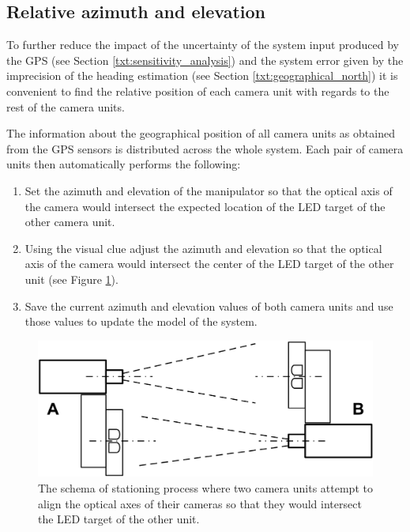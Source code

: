 \subsection{Relative azimuth and elevation}

To further reduce the impact of the uncertainty of the system input produced by the GPS (see Section \ref{txt:sensitivity_analysis}) and the system error given by the imprecision of the heading estimation (see Section \ref{txt:geographical_north}) it is convenient to find the relative position of each camera unit with regards to the rest of the camera units.

The information about the geographical position of all camera units as obtained from the GPS sensors is distributed across the whole system. Each pair of camera units then automatically performs the following:

\begin{enumerate}
	\item Set the azimuth and elevation of the manipulator so that the optical axis of the camera would intersect the expected location of the LED target of the other camera unit.
	\item Using the visual clue adjust the azimuth and elevation so that the optical axis of the camera would intersect the center of the LED target of the other unit (see Figure \ref{fig:stationing_aiming}).
	\item Save the current azimuth and elevation values of both camera units and use those values to update the model of the system.
\end{enumerate}

\begin{figure}[htb]
	\centering
	\includegraphics[width=14cm]{fig/stationing_aiming.png}
	\caption{The schema of stationing process where two camera units attempt to align the optical axes of their cameras so that they would intersect the LED target of the other unit.}
	\label{fig:stationing_aiming}
\end{figure}


